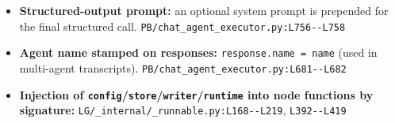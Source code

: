 \begin{itemize}
\item \textbf{Structured-output prompt:} an optional system prompt is prepended for the final structured call. \texttt{PB/\allowbreak{}chat\_\allowbreak{}agent\_\allowbreak{}executor.\allowbreak{}py:\allowbreak{}L756-\allowbreak{}-\allowbreak{}L758}
\item \textbf{Agent name stamped on responses:} \texttt{response.\allowbreak{}name = name} (used in multi-agent transcripts). \texttt{PB/\allowbreak{}chat\_\allowbreak{}agent\_\allowbreak{}executor.\allowbreak{}py:\allowbreak{}L681-\allowbreak{}-\allowbreak{}L682}
\item \textbf{Injection of \texttt{config}/\texttt{store}/\texttt{writer}/\texttt{runtime} into node functions by signature:} \texttt{LG/\allowbreak{}\_\allowbreak{}internal/\allowbreak{}\_\allowbreak{}runnable.\allowbreak{}py:\allowbreak{}L168-\allowbreak{}-\allowbreak{}L219}, \texttt{L392-\allowbreak{}-\allowbreak{}L419}
\end{itemize}

